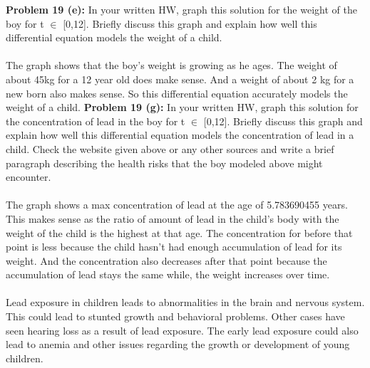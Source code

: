 \documentclass[12pt]{article}
\begin{document}
\indent \textbf{Problem 19 (e): } In your written HW, graph this solution for the weight of the boy for t $\in$ [0,12]. Briefly discuss this graph and explain how well this differential equation models the weight of a child.
\\\\
The graph shows that the boy's weight is growing as he ages.  The weight of about 45kg for a 12 year old does make sense. And a weight of about 2 kg for a new born also makes sense.  So this differential equation accurately models the weight of a child.
\newpage
\indent \textbf{Problem 19 (g): } In your written HW, graph this solution for the concentration of lead in the boy for t $\in$ [0,12]. Briefly discuss this graph and explain how well this differential equation models the concentration of lead in a child. Check the website given above or any other sources and write a brief paragraph describing the health risks that the boy modeled above might encounter. 
\\\\
The graph shows a max concentration of lead at the age of 5.783690455 years.  This makes sense as the ratio of amount of lead in the child's body with the weight of the child is the highest at that age.  The concentration for before that point is less because the child hasn't had enough accumulation of lead for its weight. And the concentration also decreases after that point because the accumulation of lead stays the same while, the weight increases over time.
\\\\
Lead exposure in children leads to abnormalities in the brain and nervous system.  This could lead to stunted growth and behavioral problems.  Other cases have seen hearing loss as a result of lead exposure. The early lead exposure could also lead to anemia and other issues regarding the growth or development of young children.  
\end{document}
